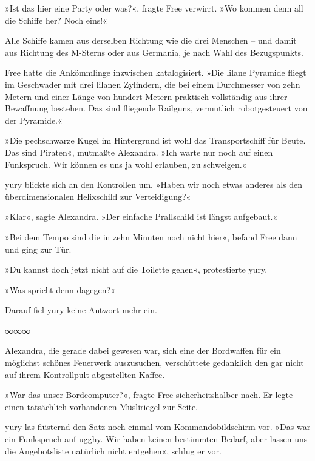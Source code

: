 »Ist das hier eine Party oder was?«, fragte Free verwirrt. »Wo kommen denn all die Schiffe her? Noch eins!«

Alle Schiffe kamen aus derselben Richtung wie die drei Menschen – und damit aus Richtung des M-Sterns oder aus Germania, je nach Wahl des Bezugspunkts.

Free hatte die Ankömmlinge inzwischen katalogisiert. »Die lilane Pyramide fliegt im Geschwader mit drei lilanen Zylindern, die bei einem Durchmesser von zehn Metern und einer Länge von hundert Metern praktisch vollständig aus ihrer Bewaffnung bestehen. Das sind fliegende Railguns, vermutlich robotgesteuert von der Pyramide.«

»Die pechschwarze Kugel im Hintergrund ist wohl das Transportschiff für Beute. Das sind Piraten«, mutmaßte Alexandra. »Ich warte nur noch auf einen Funkspruch. Wir können es uns ja wohl erlauben, zu schweigen.«

yury blickte sich an den Kontrollen um. »Haben wir noch etwas anderes als den überdimensionalen Helixschild zur Verteidigung?«

»Klar«, sagte Alexandra. »Der einfache Prallschild ist längst aufgebaut.«

»Bei dem Tempo sind die in zehn Minuten noch nicht hier«, befand Free dann und ging zur Tür.

»Du kannst doch jetzt nicht auf die Toilette gehen«, protestierte yury.

»Was spricht denn dagegen?«

Darauf fiel yury keine Antwort mehr ein.

\begin{center}
	∞∞∞
\end{center}


Alexandra, die gerade dabei gewesen war, sich eine der Bordwaffen für ein möglichst schönes Feuerwerk auszusuchen, verschüttete gedanklich den gar nicht auf ihrem Kontrollpult abgestellten Kaffee.

»War das unser Bordcomputer?«, fragte Free sicherheitshalber nach. Er legte einen tatsächlich vorhandenen Müsliriegel zur Seite.

yury las flüsternd den Satz noch einmal vom Kommandobildschirm vor. »Das war ein Funkspruch auf ugghy. Wir haben keinen bestimmten Bedarf, aber lassen uns die Angebotsliste natürlich nicht entgehen«, schlug er vor.

